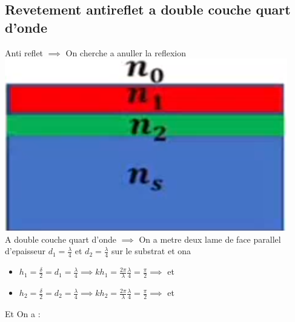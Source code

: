 \documentclass[12pt]{book}
\begin{document}
            \subsection{Revetement antireflet a double couche quart d'onde}
            Anti reflet $\implies$ On cherche a anuller la reflexion  \includegraphics[width=0.3\linewidth]{pic/doublelametopofshit.png}\\
            A double couche quart d'onde $\implies$ On a metre deux lame de face parallel d'epaisseur $d_1=\frac{\lambda}{4}$ et $d_2=\frac{\lambda}{4}$ sur le substrat et ona   \\
            \begin{itemize}
                \item $h_1=\frac{\delta}{2}=d_1=\frac{\lambda}{4} \implies kh_1=\frac{2\pi}{\lambda}\frac{\lambda}{4}=\frac{\pi}{2} \implies$ et 
                \item $h_2=\frac{\delta}{2}=d_2=\frac{\lambda}{4} \implies kh_2=\frac{2\pi}{\lambda}\frac{\lambda}{4}=\frac{\pi}{2} \implies$ et 
            \end{itemize}
            Et On a : \\
\end{document}
